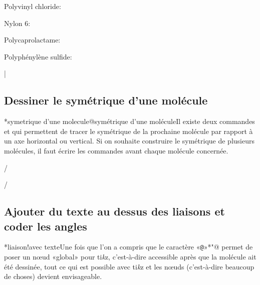 \documentclass[10pt]{article}
\makeatletter
\newcommand\idx{\@ifstar{\let\print@or@not\@gobble\idx@}{\let\print@or@not\@firstofone\idx@}}
\newcommand\idx@[1]{%
	\ifcat\expandafter\noexpand\@car#1\@nil\relax%
		\expandafter\ifx\@car#1\@nil\protect
			\index{#1}%
			\print@or@not{#1}%
		\else
			\saveexpandmode\expandarg
			\StrSubstitute{\string#1}{\string @}{\@empty\protect\symbol{'100}}[\temp@]%
			\StrGobbleLeft\temp@1[\temp@]%
			\restoreexpandmode
			\expandafter\index\expandafter{\temp@ @\protect\texttt{\protect\textbackslash\temp@}}%
			\print@or@not{\texttt{\string#1}}%
		\fi
	\else
		\index{#1}%
		\print@or@not{#1}%
	\fi
}
\newcommand\make@car@active[1]{%
	\catcode`#1\active
	\begingroup
		\lccode`\~`#1\relax
		\lowercase{\endgroup\def~}%
}
\newif\if@exstar
\newcommand\exemple{%
	\begingroup
	\parskip\z@
	\@makeother\;\@makeother\!\@makeother\?\@makeother\:%
	\@ifstar{\@exstartrue\exemple@}{\@exstarfalse\exemple@}}
\newcommand\exemple@[2][65]{%
	\medbreak\noindent
	\begingroup
		\let\do\@makeother\dospecials
		\make@car@active\ { {}}%
		\make@car@active\^^M{\par\leavevmode}%
		\make@car@active\^^I{\space\space}%
		\make@car@active\,{\leavevmode\kern\z@\string,}%
		\make@car@active\-{\leavevmode\kern\z@\string-}%
		\make@car@active\>{\leavevmode\kern\z@\string>}%
		\make@car@active\<{\leavevmode\kern\z@\string<}%
		\exemple@@{#1}{#2}%
}
\newcommand\exemple@@[3]{%
	\def\@tempa##1#3{\exemple@@@{#1}{#2}{##1}}%
	\@tempa
}
\newcommand\exemple@@@[3]{%
	\xdef\the@code{#3}%
	\endgroup
	\if@exstar
		\begingroup
			\fboxrule0.4pt
			\let\breakboxparindent\z@
			\def\bkvz@bottom{\hrule\@height\fboxrule}%
			\let\bkvz@before@breakbox\relax
			\def\bkvz@set@linewidth{\advance\linewidth\dimexpr-2\fboxrule-2\fboxsep}%
			\def\bkvz@left{\vrule\@width\fboxrule\hskip\fboxsep}%
			\def\bkvz@right{\hskip\fboxsep\vrule\@width\fboxrule}%
			\def\bkvz@top{\hbox to \hsize{%
				\vrule\@width\fboxrule\@height\fboxrule
				\leaders\bkvz@bottom\hfill
				\ECFAugie
				\fboxsep\z@
				\colorbox{black}{\kern0.25em\color{white}\footnotesize\lower0.5ex\hbox{\strut#2}\kern0.25em}%
				\leaders\bkvz@bottom\hfill
				\vrule\@width\fboxrule\@height\fboxrule}}%
			\breakbox
				\kern.5ex\relax
				\ttfamily\footnotesize\the@code\par
				\normalfont
				\kern3pt
				\hrule height0.1pt width\linewidth depth0.1pt
				\vskip5pt
				\rightskip0pt plus 1fill
				\everypar{{\color{lightgray}\rlap{\vrule height0.1pt width\linewidth depth0.1pt}}\hskip0pt plus 1fill}%
				\newlinechar`\^^M\everyeof{\noexpand}\scantokens{#3}\par
			\endbreakbox
		\endgroup
	\else
		\vskip0.5ex
		\boxput*(0,1)
			{\fboxsep\z@
			\hbox{\ECFAugie\colorbox{black}{\leavevmode\kern0.25em{\color{white}\footnotesize\strut#2}\kern0.25em}}%
			}%
			{\fboxsep5pt
			\fbox{%
				$\vcenter{\hsize\dimexpr0.#1\linewidth-\fboxsep-\fboxrule\relax
					\kern5pt\parskip0pt \ttfamily\footnotesize\the@code}%
				\vcenter{\kern5pt\hsize\dimexpr\linewidth-0.#1\linewidth-\fboxsep-\fboxrule\relax
					\everypar{{\color{lightgray}\rlap{\vrule height0.1pt width\dimexpr\linewidth-0.#1\linewidth-\fboxsep-\fboxrule depth0.1pt}}}%
					\footnotesize\newlinechar`\^^M\everyeof{\noexpand}\scantokens{#3}}$%
				}%
			}%
	\fi
	\medbreak
	\endgroup
}
\let\do\@makeother\dospecials
\newcommand\TIKZ{ti\textit kz\xspace}
\makeatother
\begin{document}
Polyvinyl chloride:
\bigskip

Nylon 6:
\bigskip

Polycaprolactame:\setatomsep{2em}
\bigskip

\setpolymerdelim[]
Polyphénylène sulfide:
\bigskip

|

\subsection{Dessiner le symétrique d'une molécule}\label{retournement}
\idx*{symetrique d'une molecule@symétrique d'une molécule}Il existe deux commandes \idx{\hflipnext} et \idx{\vflipnext} qui permettent de tracer le symétrique de la prochaine molécule par rapport à un axe horizontal ou vertical. Si on souhaite construire le symétrique de plusieurs molécules, il faut écrire les commandes avant chaque molécule concernée.

\exemple{Symétriques}/%

\vflipnext%
\medskip

\hflipnext%
/

\subsection{Ajouter du texte au dessus des liaisons et coder les angles}
\idx*{liaison!avec texte}Une fois que l'on a compris que le caractère «\verb-@-»\idx*{"@} permet de poser un nœud «global» pour \TIKZ, c'est-à-dire accessible après que la molécule ait été dessinée, tout ce qui est possible avec \TIKZ et les nœuds (c'est-à-dire beaucoup de choses) devient envisageable.
\end{document}
